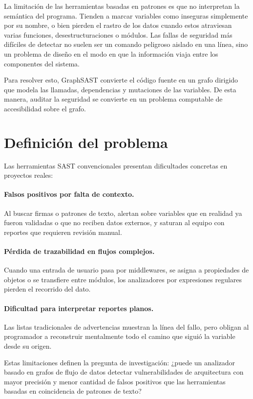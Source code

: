 La limitación de las herramientas basadas en patrones es que no interpretan la semántica del programa. Tienden a marcar variables como inseguras simplemente por su nombre, o bien pierden el rastro de los datos cuando estos atraviesan varias funciones, desestructuraciones o módulos. Las fallas de seguridad más difíciles de detectar no suelen ser un comando peligroso aislado en una línea, sino un problema de diseño en el modo en que la información viaja entre los componentes del sistema.

Para resolver esto, GraphSAST convierte el código fuente en un grafo dirigido que modela las llamadas, dependencias y mutaciones de las variables. De esta manera, auditar la seguridad se convierte en un problema computable de accesibilidad sobre el grafo.

\section{Definición del problema}\label{sec:n1.2}

Las herramientas SAST convencionales presentan dificultades concretas en proyectos reales:

\paragraph{Falsos positivos por falta de contexto.} Al buscar firmas o patrones de texto, alertan sobre variables que en realidad ya fueron validadas o que no reciben datos externos, y saturan al equipo con reportes que requieren revisión manual.

\paragraph{Pérdida de trazabilidad en flujos complejos.} Cuando una entrada de usuario pasa por middlewares, se asigna a propiedades de objetos o se transfiere entre módulos, los analizadores por expresiones regulares pierden el recorrido del dato.

\paragraph{Dificultad para interpretar reportes planos.} Las listas tradicionales de advertencias muestran la línea del fallo, pero obligan al programador a reconstruir mentalmente todo el camino que siguió la variable desde su origen.

Estas limitaciones definen la pregunta de investigación: ¿puede un analizador basado en grafos de flujo de datos detectar vulnerabilidades de arquitectura con mayor precisión y menor cantidad de falsos positivos que las herramientas basadas en coincidencia de patrones de texto?


